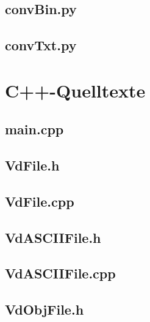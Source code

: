 \documentclass[a4paper,12pt,bibliography=totoc, listof=totoc,titlepage,pointlessnumbers]{scrreprt}
\begin{document}
\begin{appendices}
\section{convBin.py}
\label{a:convBin.py}


\section{convTxt.py}
\label{a:convTxt.py}


\chapter{C++-Quelltexte}
\label{a:cpp}

\section{main.cpp}
\label{a:main.cpp}


\section{VdFile.h}
\label{a:VdFile.h}


\section{VdFile.cpp}
\label{a:VdFile.cpp}


\section{VdASCIIFile.h}
\label{a:VdASCIIFile.h}


\section{VdASCIIFile.cpp}
\label{a:VdASCIIFile.cpp}


\section{VdObjFile.h}
\label{a:VdObjFile.h}



\end{appendices}
\end{document}
